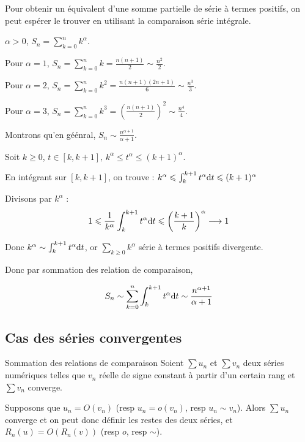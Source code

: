 \begin{exemple}
    Pour obtenir un équivalent d'une somme partielle de série à termes positifs, 
    on peut espérer le trouver en utilisant la comparaison série intégrale.

    $\alpha > 0$, $\displaystyle S_n = \sum_{k = 0 }^{n } k^\alpha$. 

    Pour $\alpha = 1$, $\displaystyle S_n = \sum_{k = 0 }^{n } k = \frac{n(n + 1)}{2} \sim \frac{n^2}{2}$.

    Pour $\alpha = 2$, $\displaystyle S_n = \sum_{k = 0 }^{n } k^2 = \frac{n(n + 1)(2n + 1)}{6} \sim \frac{n^3}{3}$.

    Pour $\alpha = 3$, $\displaystyle S_n = \sum_{k = 0 }^{n } k^3 = \left( \frac{n(n + 1)}{2} \right)^2 \sim \frac{n^4}{4}$.

    Montrons qu'en géénral, $\displaystyle S_n \sim \frac{n^{\alpha + 1}}{\alpha + 1}$.

    Soit $k \geqslant 0$, $t \in [k, k + 1], \, k^\alpha \leqslant t^\alpha \leqslant (k + 1)^\alpha$.

    En intégrant sur $[k, k + 1]$, on trouve : $k^\alpha \leqslant \int_{k}^{k + 1} t^\alpha \text d t \leqslant (k + 1)^\alpha$

    Divisons par $k^\alpha$ : 
    $$ 1 \leqslant \frac 1 {k^\alpha} \int_{k}^{k + 1} t^\alpha \text d t \leqslant \left( \frac{k+1} k \right)^\alpha \longrightarrow 1$$

    Donc $k^\alpha \sim \int_{k }^{k + 1} t^\alpha \text d t$, or $\sum_{k \geqslant 0 } k^\alpha$ série à termes positifs divergente. 

    Donc par sommation des relation de comparaison, 

    $$S_n \sim \sum_{k = 0}^{n } \int_{k}^{k + 1} t^\alpha \text d t \sim \frac{n^{\alpha + 1}}{\alpha + 1}$$
\end{exemple}


\subsection{Cas des séries convergentes }

\begin{theoreme}{Sommation des relations de comparaison}{}
    Soient $\sum u_n$ et $\sum v_n$ deux séries numériques telles que 
    $v_n$ réelle de signe constant à partir d'un certain rang et $\sum v_n$ converge.

    Supposons que $u_n = O(v_n)$ (resp $u_n = o(v_n)$, resp $u_n \sim v_n$).
    Alors $\sum u_n$ converge et on peut donc définir les restes des deux séries, et 
    $\displaystyle R_n(u) = O(R_n(v))$ (resp $o$, resp $\sim$).
\end{theoreme}

